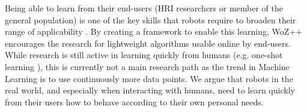\documentclass[manuscript, review, anonymous]{acmart}
\newcommand{\ES}[1]{\added[id=ES]{#1}}
\newcommand{\woz}{WoZ++\xspace}
\begin{document}

Being able to learn from their end-users (HRI researchers or member of the
general population) is one of the key skills that robots require to broaden
their range of applicability \cite{dautenhahn2004robots}.  By creating a
framework to enable this learning, \woz encourages the research for
lightweight algorithms usable online by end-users. While research is still 
active in learning quickly from humans (e.g. one-shot learning \cite{scheutz2017spoken}),
this is currently not a main research path as the trend in Machine Learning
is to use continuously more data points. We argue that robots in the real world,
and especially when interacting with humans, need to learn quickly from their
users how to behave according to their own personal needs.%




\end{document}
